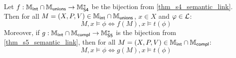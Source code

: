 \begin{theorem}
\label{thm_s4s5_translation}

    Let $f: \mathbb{M}_{\mathsf{int}} \cap \mathbb{M}_{\mathsf{unions}} \to \mathbb{M}^*_{\mathsf{S4}}$ be the bijection from
    \cref{thm_s4_semantic_link}. Then for all $M = (X, P, V) \in \mathbb{M}_{\mathsf{int}}
    \cap \mathbb{M}_{\mathsf{unions}}$, $x \in X$ and $\varphi \in \mathcal{L}$:
    \begin{equation}
        \label{eqn_s4s5_1}
        M, x \models \phi \iff f(M), x \models t(\phi)
    \end{equation}
    Moreover, if $g: \mathbb{M}_{\mathsf{int}} \cap \mathbb{M}_{\mathsf{compl}} \to \mathbb{M}^*_{\mathsf{S5}}$ is the bijection from
    \cref{thm_s5_semantic_link}, then for all $M = (X, P, V) \in
    \mathbb{M}_{\mathsf{int}} \cap \mathbb{M}_{\mathsf{compl}}$:
    \begin{equation}
        \label{eqn_s4s5_2}
        M, x \models \phi \iff g(M), x \models t(\phi)
    \end{equation}
\end{theorem}

